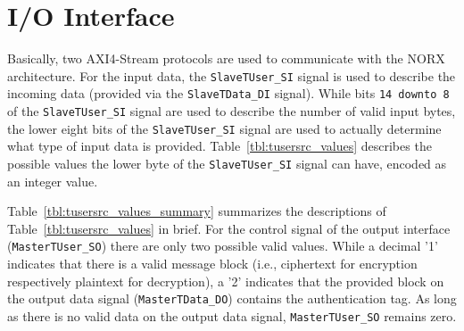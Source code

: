 \documentclass[%
 halfparskip
]{scrartcl}
\begin{document}
\section{I/O Interface}

Basically, two AXI4-Stream protocols are used to communicate with the
NORX architecture. For the input data, the \texttt{SlaveTUser\_SI}
signal is used to describe the incoming data (provided via the
\texttt{SlaveTData\_DI} signal). While bits \texttt{14 downto 8} of
the \texttt{SlaveTUser\_SI} signal are used to describe the number of
valid input bytes, the lower eight bits of the \texttt{SlaveTUser\_SI}
signal are used to actually determine what type of input data is
provided. Table~\ref{tbl:tusersrc_values} describes the possible
values the lower byte of the \texttt{SlaveTUser\_SI} signal can have,
encoded as an integer value.


Table~\ref{tbl:tusersrc_values_summary} summarizes the descriptions of
Table~\ref{tbl:tusersrc_values} in brief. For the control signal of
the output interface (\texttt{MasterTUser\_SO}) there are only two
possible valid values. While a decimal '1' indicates that there is a
valid message block (i.e., ciphertext for encryption respectively
plaintext for decryption), a '2' indicates that the provided block on
the output data signal (\texttt{MasterTData\_DO}) contains the
authentication tag. As long as there is no valid data on the output
data signal, \texttt{MasterTUser\_SO} remains zero.
\end{document}
